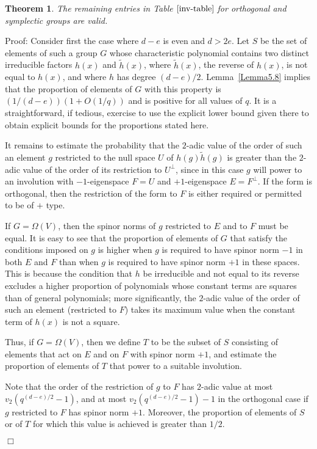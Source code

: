 \documentclass[12pt]{article}
\newtheorem{theorem}[definition]{Theorem}
\newenvironment{proof}{\normalsize {\sc Proof}:}{{\hfill $\Box$ \\}}
\def\Oh{O}  %
\begin{document}
\begin{theorem}
The remaining entries in Table $\ref{inv-table}$ 
for orthogonal and symplectic groups are valid.
\end{theorem}
\begin{proof}
Consider first the case where $d-e$ is even and $d>2e$. 
Let $S$ be the set of elements of such a group $G$ whose 
characteristic polynomial contains two distinct irreducible factors $h(x)$ 
and $\tilde{h}(x)$, where $\tilde{h}(x)$, the reverse of $h(x)$, is not
equal to $h(x)$, and where $h$ has degree $(d-e)/2$.  
Lemma~\ref{Lemma5.8} implies that 
the proportion of elements of $G$ with this property is
$(1/(d-e))(1+\Oh(1/q))$ and is positive for all values of $q$.  
It is a straightforward, if tedious, exercise 
to use the explicit lower bound given there 
to obtain explicit bounds for the proportions stated here.

It remains to estimate the probability that the 
$2$-adic value of the order of such an element $g$ 
restricted to the null space
$U$ of $h(g)\tilde{h}(g)$ is greater than the $2$-adic value of 
the order of its 
restriction to $U^\perp$, since in this case $g$ will power to an involution
with $-1$-eigenspace $F=U$ and $+1$-eigenspace $E=F^\perp$.
If the form is orthogonal, then the restriction of the form to 
$F$ is either required or permitted to be of $+$ type.

If $G=\Omega(V)$, then the spinor norms of $g$ restricted to $E$ and to $F$ 
must be equal.  It is easy to see that
the proportion of elements of $G$ that satisfy the conditions 
imposed on $g$ is higher when $g$ is required to have spinor norm
$-1$ in both $E$ and $F$ than when $g$ is required to have spinor 
norm $+1$ in these spaces. This is because the condition that $h$ 
be irreducible
and not equal to its reverse excludes a higher proportion of polynomials 
whose constant terms are squares than of general polynomials;
more significantly, the $2$-adic value
of the order of such an element (restricted to $F$) takes its 
maximum value when the constant term of $h(x)$ is not a square.

Thus, if $G=\Omega(V)$, then we define $T$ to be the subset of $S$ 
consisting of elements that act on $E$ and on $F$ with spinor norm $+1$, 
and estimate the proportion of elements of $T$ that 
power to a suitable involution.  

Note that the order of the restriction of $g$ to $F$ has $2$-adic value at 
most $v_2(q^{(d-e)/2}-1)$, and at most $v_2(q^{(d-e)/2}-1)-1$ 
in the orthogonal case if $g$ restricted to $F$ has spinor norm $+1$.  
Moreover, the proportion of elements of $S$ or of $T$ for which this value
is achieved is greater than $1/2$.


\end{proof}
\end{document}
